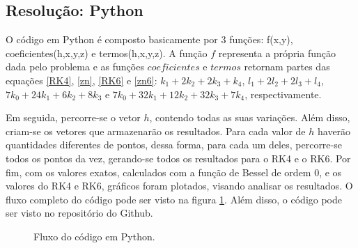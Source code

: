 \documentclass[a4paper,11pt]{article}
\begin{document}
\subsection{Resolução: Python}

    O código em Python é composto basicamente por 3 funções: f(x,y), coeficientes(h,x,y,z) e termos(h,x,y,z). A função $f$ representa a própria função dada pelo problema e as funções $coeficientes$ e $termos$ retornam partes das equações \ref{RK4}, \ref{zn}, \ref{RK6} e \ref{zn6}: $k_1+2k_2+2k_3+k_4$, $l_1+2l_2+2l_3+l_4$, $7k_0+24k_1+6k_2+8k_3$ e $7k_0+32k_1+12k_2+32k_3+7k_4$, respectivamente.
    
    Em seguida, percorre-se o vetor $h$, contendo todas as suas variações. Além disso, criam-se os vetores que armazenarão os resultados. Para cada valor de $h$ haverão quantidades diferentes de pontos, dessa forma, para cada um deles, percorre-se todos os pontos da vez, gerando-se todos os resultados para o RK4 e o RK6. Por fim, com os valores exatos, calculados com a função de Bessel de ordem 0, e os valores do RK4 e RK6, gráficos foram plotados, visando analisar os resultados. O fluxo completo do código pode ser visto na figura \ref{fluxograma}. Além disso, o código pode ser visto no repositório do Github.
    
    \begin{figure}[H]
        \centering
        \caption[width=\columnwidth]{Fluxo do código em Python.}
        \label{fluxograma}
    \end{figure}
\end{document}
